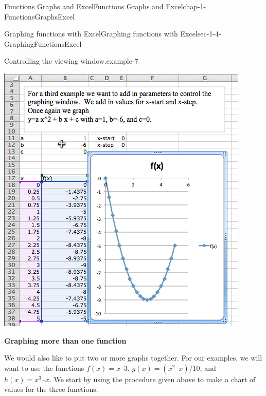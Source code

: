 \documentclass[oneside,10pt,]{book}
\newcommand{\terminology}[1]{\textbf{#1}}
\numberwithin{equation}{section}
\begin{document}
\begin{chapterptx}{Functions Graphs and Excel}{}{Functions Graphs and Excel}{}{}{chap-1-FunctionsGraphsExcel}
\begin{sectionptx}{Graphing functions with Excel}{}{Graphing functions with Excel}{}{}{sec-1-4-GraphingFunctionsExcel}
\begin{example}{Controlling the viewing window.}{example-7}
\begin{sidebyside}{1}{0.1}{0.1}{0}
\begin{sbspanel}{0.8}
\includegraphics[width=1\linewidth]{images/sec1-4-9.png}
\end{sbspanel}%
\end{sidebyside}%
\end{example}
\hypertarget{p-331}{}%
\terminology{Graphing more than one function}%
\par
\hypertarget{p-332}{}%
We would also like to put two or more graphs together.  For our examples, we will want to use the functions \(f(x) = x – 3\), \(g(x) = (x^2 – x)/10\), and \(h(x) = x^3 – x\).  We start by using the procedure given above to make a chart of values for the three functions.%
\begin{sidebyside}{1}{0.2}{0.2}{0}%
\begin{sbspanel}{0.6}%

\end{sbspanel}
\end{sidebyside}
\end{sectionptx}
\end{chapterptx}
\end{document}
